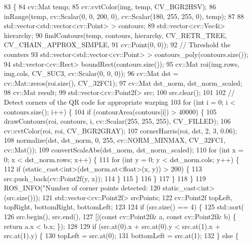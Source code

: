 \begin{DoxyCode}
83                             \{
84   cv::Mat temp;
85   cv::cvtColor(img, temp, CV\_BGR2HSV);
86   inRange(temp, cv::Scalar(0, 0, 200, 0), cv::Scalar(180, 255, 255, 0), temp);
87 
88   std::vector<std::vector<cv::Point> > contours;
89   std::vector<cv::Vec4i> hierarchy;
90   findContours(temp, contours, hierarchy, CV\_RETR\_TREE, CV\_CHAIN\_APPROX\_SIMPLE,
91                cv::Point(0, 0));
92   \textcolor{comment}{// Threshold the counters}
93   std::vector<std::vector<cv::Point> > contours\_poly(contours.size());
94   std::vector<cv::Rect> boundRect(contours.size());
95   cv::Mat roi(img.rows, img.cols, CV\_8UC3, cv::Scalar(0, 0, 0));
96   cv::Mat dst = cv::Mat::zeros(roi.size(), CV\_32FC1);
97   cv::Mat dst\_norm, dst\_norm\_scaled;
98   cv::Mat result;
99   std::vector<cv::Point2f> src;
100   src.clear();
101 
102   \textcolor{comment}{// Detect corners of the QR code for appropriate warping}
103   \textcolor{keywordflow}{for} (\textcolor{keywordtype}{int} i = 0; i < contours.size(); i++) \{
104     \textcolor{keywordflow}{if} (contourArea(contours[i]) > 40000) \{
105       drawContours(roi, contours, i, cv::Scalar(255, 255, 255), CV\_FILLED);
106       cv::cvtColor(roi, roi, CV\_BGR2GRAY);
107       cornerHarris(roi, dst, 2, 3, 0.06);
108       normalize(dst, dst\_norm, 0, 255, cv::NORM\_MINMAX, CV\_32FC1, cv::Mat());
109       convertScaleAbs(dst\_norm, dst\_norm\_scaled);
110       \textcolor{keywordflow}{for} (\textcolor{keywordtype}{int} x = 0; x < dst\_norm.rows; x++) \{
111         \textcolor{keywordflow}{for} (\textcolor{keywordtype}{int} y = 0; y < dst\_norm.cols; y++) \{
112           \textcolor{keywordflow}{if} (static\_cast<int>(dst\_norm.at<\textcolor{keywordtype}{float}>(x, y)) > 200) \{
113             src.push\_back(cv::Point2f(y, x));
114           \}
115         \}
116       \}
117     \}
118   \}
119   ROS\_INFO(\textcolor{stringliteral}{"Number of corner points detected: %
120            static\_cast<int>(src.size()));
121   std::vector<cv::Point2f> srcPoints;
122   cv::Point2f topLeft, topRight, bottomRight, bottomLeft;
123 
124   \textcolor{keywordflow}{if} (src.size() == 4) \{
125     std::sort(
126         src.begin(), src.end(),
127         [](\textcolor{keyword}{const} cv::Point2f& a, \textcolor{keyword}{const} cv::Point2f& b) \{ \textcolor{keywordflow}{return} a.x < b.x; \});
128 
129     \textcolor{keywordflow}{if} (src.at(0).x + src.at(0).y < src.at(1).x + src.at(1).y) \{
130       topLeft = src.at(0);
131       bottomLeft = src.at(1);
132     \} \textcolor{keywordflow}{else} \{
}
\end{DoxyCode}
